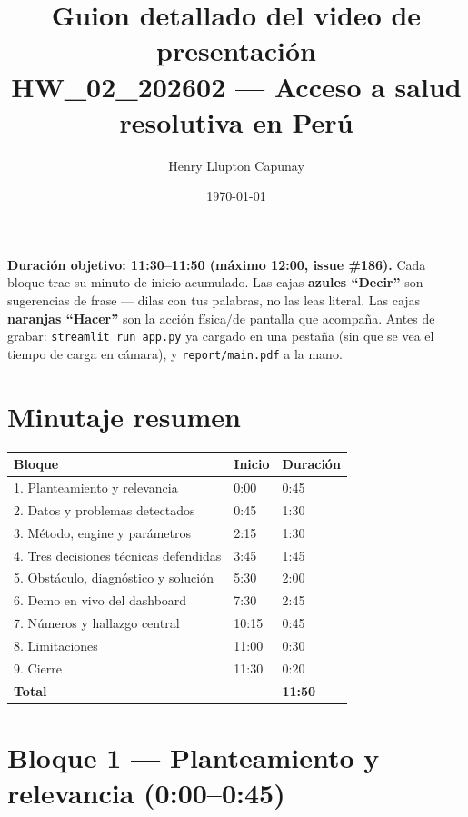 \documentclass[11pt]{article}
\title{Guion detallado del video de presentación\\
\large HW\_02\_202602 --- Acceso a salud resolutiva en Perú}
\author{Henry Llupton Capunay}
\date{\today}
\begin{document}
\maketitle

\begin{tcolorbox}[colback=gray!8, colframe=gray!50, arc=2pt]
\textbf{Duración objetivo: 11:30--11:50 (máximo 12:00, issue \#186).}
Cada bloque trae su minuto de inicio acumulado. Las cajas \textcolor{decirborde}{\textbf{azules ``Decir''}} son sugerencias de frase --- dilas con tus palabras, no las leas literal. Las cajas \textcolor{hacerborde}{\textbf{naranjas ``Hacer''}} son la acción física/de pantalla que acompaña. Antes de grabar: \texttt{streamlit run app.py} ya cargado en una pestaña (sin que se vea el tiempo de carga en cámara), y \texttt{report/main.pdf} a la mano.
\end{tcolorbox}

\tableofcontents
\vspace{0.3cm}

\section{Minutaje resumen}

\begin{center}
\begin{tabular}{lll}
\toprule
\textbf{Bloque} & \textbf{Inicio} & \textbf{Duración} \\
\midrule
1. Planteamiento y relevancia & 0:00 & 0:45 \\
2. Datos y problemas detectados & 0:45 & 1:30 \\
3. Método, engine y parámetros & 2:15 & 1:30 \\
4. Tres decisiones técnicas defendidas & 3:45 & 1:45 \\
5. Obstáculo, diagnóstico y solución & 5:30 & 2:00 \\
6. Demo en vivo del dashboard & 7:30 & 2:45 \\
7. Números y hallazgo central & 10:15 & 0:45 \\
8. Limitaciones & 11:00 & 0:30 \\
9. Cierre & 11:30 & 0:20 \\
\midrule
\textbf{Total} & & \textbf{11:50} \\
\bottomrule
\end{tabular}
\end{center}

\section{Bloque 1 --- Planteamiento y relevancia (0:00--0:45)}
\end{document}
